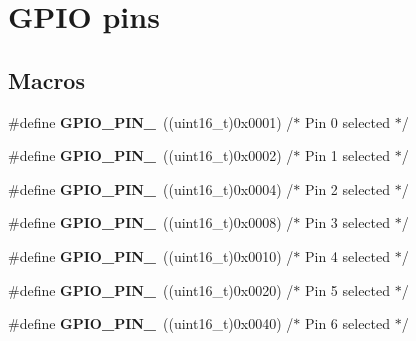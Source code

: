 \hypertarget{group___g_p_i_o__pins}{\section{G\-P\-I\-O pins}
\label{group___g_p_i_o__pins}
}
\subsection*{Macros}
\begin{DoxyCompactItemize}
\item 
\hypertarget{group___g_p_i_o__pins_ga176efbf43a259b7bb0a85a47401505be}{\#define {\bfseries G\-P\-I\-O\-\_\-\-P\-I\-N\-\_}~((uint16\-\_\-t)0x0001)  /$\ast$ Pin 0 selected    $\ast$/}\label{group___g_p_i_o__pins_ga176efbf43a259b7bb0a85a47401505be}

\item 
\hypertarget{group___g_p_i_o__pins_ga6c35af4e75c3cb57bb650feaa7a136b5}{\#define {\bfseries G\-P\-I\-O\-\_\-\-P\-I\-N\-\_}~((uint16\-\_\-t)0x0002)  /$\ast$ Pin 1 selected    $\ast$/}\label{group___g_p_i_o__pins_ga6c35af4e75c3cb57bb650feaa7a136b5}

\item 
\hypertarget{group___g_p_i_o__pins_ga6eee38b797a7268f04357dfa2759efd2}{\#define {\bfseries G\-P\-I\-O\-\_\-\-P\-I\-N\-\_}~((uint16\-\_\-t)0x0004)  /$\ast$ Pin 2 selected    $\ast$/}\label{group___g_p_i_o__pins_ga6eee38b797a7268f04357dfa2759efd2}

\item 
\hypertarget{group___g_p_i_o__pins_gadcaf899c018a0dde572b5af783565c62}{\#define {\bfseries G\-P\-I\-O\-\_\-\-P\-I\-N\-\_}~((uint16\-\_\-t)0x0008)  /$\ast$ Pin 3 selected    $\ast$/}\label{group___g_p_i_o__pins_gadcaf899c018a0dde572b5af783565c62}

\item 
\hypertarget{group___g_p_i_o__pins_gab3871e35868deecd260e586ad70d4b83}{\#define {\bfseries G\-P\-I\-O\-\_\-\-P\-I\-N\-\_}~((uint16\-\_\-t)0x0010)  /$\ast$ Pin 4 selected    $\ast$/}\label{group___g_p_i_o__pins_gab3871e35868deecd260e586ad70d4b83}

\item 
\hypertarget{group___g_p_i_o__pins_ga01cc9ed93f6fd12fd3403362779aaa18}{\#define {\bfseries G\-P\-I\-O\-\_\-\-P\-I\-N\-\_}~((uint16\-\_\-t)0x0020)  /$\ast$ Pin 5 selected    $\ast$/}\label{group___g_p_i_o__pins_ga01cc9ed93f6fd12fd3403362779aaa18}

\item 
\hypertarget{group___g_p_i_o__pins_ga9089f18f20ec88ee38ce6f27389e6d7e}{\#define {\bfseries G\-P\-I\-O\-\_\-\-P\-I\-N\-\_}~((uint16\-\_\-t)0x0040)  /$\ast$ Pin 6 selected    $\ast$/}\label{group___g_p_i_o__pins_ga9089f18f20ec88ee38ce6f27389e6d7e}


\end{DoxyCompactItemize}
